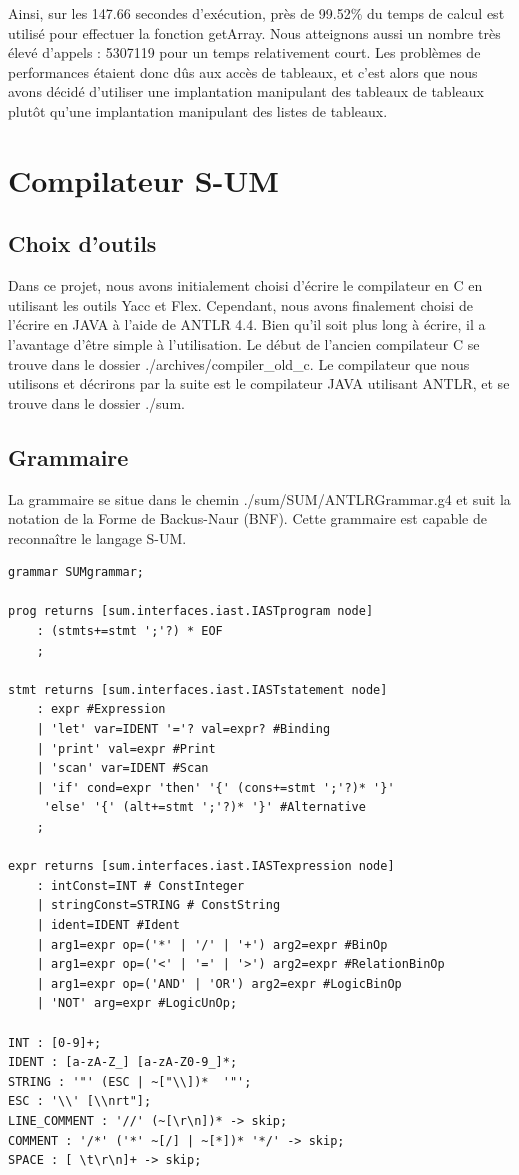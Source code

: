 \documentclass[a4paper,12pt]{report}
\begin{document}
Ainsi, sur les 147.66 secondes d'exécution, près de 99.52\% du temps de calcul est utilisé pour effectuer la fonction getArray.
Nous atteignons aussi un nombre très élevé d'appels : 5307119 pour un temps relativement court. Les problèmes de performances 
étaient donc dûs aux accès de tableaux, et c'est alors que nous avons décidé d'utiliser une implantation manipulant des tableaux de
tableaux plutôt qu'une implantation manipulant des listes de tableaux.


\chapter{Compilateur S-UM}
\section{Choix d'outils}
Dans ce projet, nous avons initialement choisi d'écrire le compilateur en C en utilisant les outils Yacc et Flex. Cependant,
nous avons finalement choisi de l'écrire en JAVA à l'aide de ANTLR 4.4. Bien qu'il soit plus long à écrire, il a
l'avantage d'être simple à l'utilisation.
Le début de l'ancien compilateur C se trouve dans le dossier ./archives/compiler\_old\_c.
Le compilateur que nous utilisons et décrirons par la suite est le compilateur JAVA utilisant ANTLR, et se trouve dans le dossier 
./sum.

\section{Grammaire}
La grammaire se situe dans le chemin ./sum/SUM/ANTLRGrammar.g4 et suit la notation de la Forme de Backus-Naur (BNF).
Cette grammaire est capable de reconnaître le langage S-UM.
\begin{verbatim}
grammar SUMgrammar;

prog returns [sum.interfaces.iast.IASTprogram node]
	: (stmts+=stmt ';'?) * EOF
	;
	
stmt returns [sum.interfaces.iast.IASTstatement node]
	: expr #Expression
	| 'let' var=IDENT '='? val=expr? #Binding
	| 'print' val=expr #Print
	| 'scan' var=IDENT #Scan
	| 'if' cond=expr 'then' '{' (cons+=stmt ';'?)* '}'
	 'else' '{' (alt+=stmt ';'?)* '}' #Alternative
	;
	
expr returns [sum.interfaces.iast.IASTexpression node]
	: intConst=INT # ConstInteger
	| stringConst=STRING # ConstString
	| ident=IDENT #Ident
	| arg1=expr op=('*' | '/' | '+') arg2=expr #BinOp
	| arg1=expr op=('<' | '=' | '>') arg2=expr #RelationBinOp
	| arg1=expr op=('AND' | 'OR') arg2=expr #LogicBinOp
	| 'NOT' arg=expr #LogicUnOp;
	
INT : [0-9]+;
IDENT : [a-zA-Z_] [a-zA-Z0-9_]*;
STRING : '"' (ESC | ~["\\])*  '"';
ESC : '\\' [\\nrt"];
LINE_COMMENT : '//' (~[\r\n])* -> skip;
COMMENT : '/*' ('*' ~[/] | ~[*])* '*/' -> skip;
SPACE : [ \t\r\n]+ -> skip;
\end{verbatim}
\end{document}
